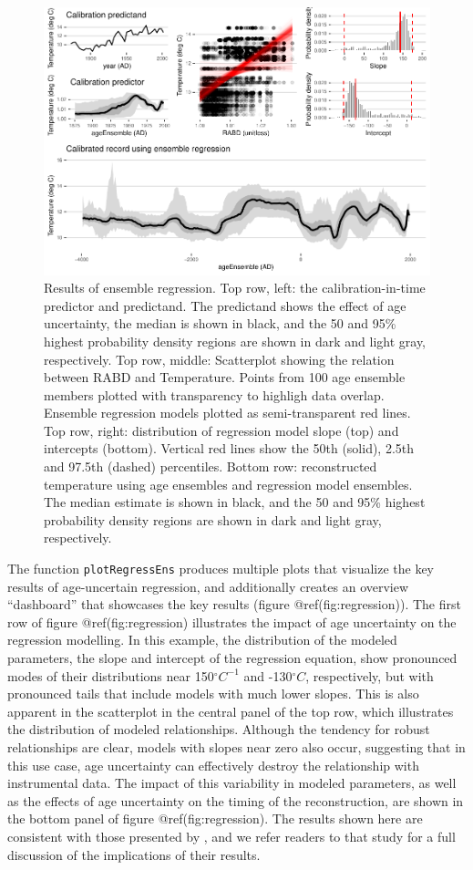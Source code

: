 \documentclass[gchron, manuscript]{copernicus}
\begin{document}
\begin{figure}
\includegraphics[width=12cm]{geoChronR-paper_files/figure-latex/regression-1} \caption{Results of ensemble regression. Top row, left: the calibration-in-time predictor and predictand. The predictand shows the effect of age uncertainty, the median is shown in black, and the 50 and 95\% highest probability density regions are shown in dark and light gray, respectively. Top row, middle: Scatterplot showing the relation between RABD and Temperature. Points from 100 age ensemble members plotted with transparency to highligh data overlap. Ensemble regression models plotted as semi-transparent red lines. Top row, right: distribution of regression model slope (top) and intercepts (bottom). Vertical red lines show the 50th (solid), 2.5th and 97.5th (dashed) percentiles. Bottom row: reconstructed temperature using age ensembles and regression model ensembles. The median estimate is shown in black, and the 50 and 95\% highest probability density regions are shown in dark and light gray, respectively.}\label{fig:regression}
\end{figure}

The function \texttt{plotRegressEns} produces multiple plots that
visualize the key results of age-uncertain regression, and additionally
creates an overview ``dashboard'' that showcases the key results (figure
@ref(fig:regression)). The first row of figure @ref(fig:regression)
illustrates the impact of age uncertainty on the regression modelling.
In this example, the distribution of the modeled parameters, the slope
and intercept of the regression equation, show pronounced modes of their
distributions near 150\(^\circ C^{-1}\) and -130\(^\circ C\),
respectively, but with pronounced tails that include models with much
lower slopes. This is also apparent in the scatterplot in the central
panel of the top row, which illustrates the distribution of modeled
relationships. Although the tendency for robust relationships are clear,
models with slopes near zero also occur, suggesting that in this use
case, age uncertainty can effectively destroy the relationship with
instrumental data. The impact of this variability in modeled parameters,
as well as the effects of age uncertainty on the timing of the
reconstruction, are shown in the bottom panel of figure
@ref(fig:regression). The results shown here are consistent with those
presented by \citet{Boldt2015}, and we refer readers to that study for a
full discussion of the implications of their results.
\end{document}
